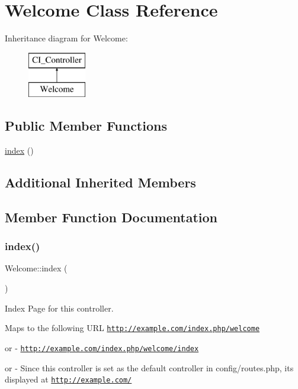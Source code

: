 \hypertarget{class_welcome}{}\section{Welcome Class Reference}
\label{class_welcome}
Inheritance diagram for Welcome\+:\begin{figure}[H]
\begin{center}
\leavevmode
\includegraphics[height=2.000000cm]{class_welcome}
\end{center}
\end{figure}
\subsection*{Public Member Functions}
\begin{DoxyCompactItemize}
\item 
\mbox{\hyperlink{class_welcome_a8aadbfbd06b65a6538badbed8569b293}{index}} ()
\end{DoxyCompactItemize}
\subsection*{Additional Inherited Members}


\subsection{Member Function Documentation}
\mbox{\label{class_welcome_a8aadbfbd06b65a6538badbed8569b293}} 
\subsubsection{\texorpdfstring{index()}{index()}}
{\footnotesize\ttfamily Welcome\+::index (\begin{DoxyParamCaption}{ }\end{DoxyParamCaption})}

Index Page for this controller.

Maps to the following U\+RL \href{http://example.com/index.php/welcome}{\tt http\+://example.\+com/index.\+php/welcome}
\begin{DoxyItemize}
\item or -\/ \href{http://example.com/index.php/welcome/index}{\tt http\+://example.\+com/index.\+php/welcome/index}
\item or -\/ Since this controller is set as the default controller in config/routes.\+php, it\textquotesingle{}s displayed at \href{http://example.com/}{\tt http\+://example.\+com/}
\end{DoxyItemize}

